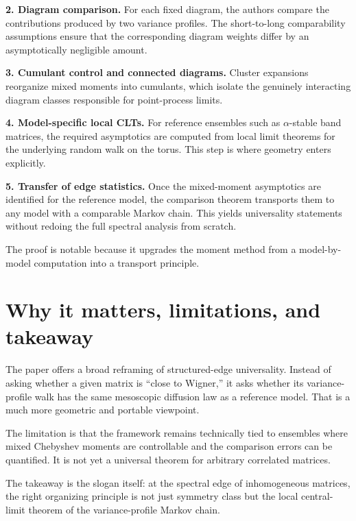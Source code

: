 \documentclass[11pt]{article}
\begin{document}
\textbf{2. Diagram comparison.} For each fixed diagram, the authors compare the contributions produced by two variance profiles. The short-to-long comparability assumptions ensure that the corresponding diagram weights differ by an asymptotically negligible amount.

\textbf{3. Cumulant control and connected diagrams.} Cluster expansions reorganize mixed moments into cumulants, which isolate the genuinely interacting diagram classes responsible for point-process limits.

\textbf{4. Model-specific local CLTs.} For reference ensembles such as $\alpha$-stable band matrices, the required asymptotics are computed from local limit theorems for the underlying random walk on the torus. This step is where geometry enters explicitly.

\textbf{5. Transfer of edge statistics.} Once the mixed-moment asymptotics are identified for the reference model, the comparison theorem transports them to any model with a comparable Markov chain. This yields universality statements without redoing the full spectral analysis from scratch.

The proof is notable because it upgrades the moment method from a model-by-model computation into a transport principle.

\section*{Why it matters, limitations, and takeaway}
The paper offers a broad reframing of structured-edge universality. Instead of asking whether a given matrix is ``close to Wigner,'' it asks whether its variance-profile walk has the same mesoscopic diffusion law as a reference model. That is a much more geometric and portable viewpoint.

The limitation is that the framework remains technically tied to ensembles where mixed Chebyshev moments are controllable and the comparison errors can be quantified. It is not yet a universal theorem for arbitrary correlated matrices.

The takeaway is the slogan itself: at the spectral edge of inhomogeneous matrices, the right organizing principle is not just symmetry class but the local central-limit theorem of the variance-profile Markov chain.
\end{document}
